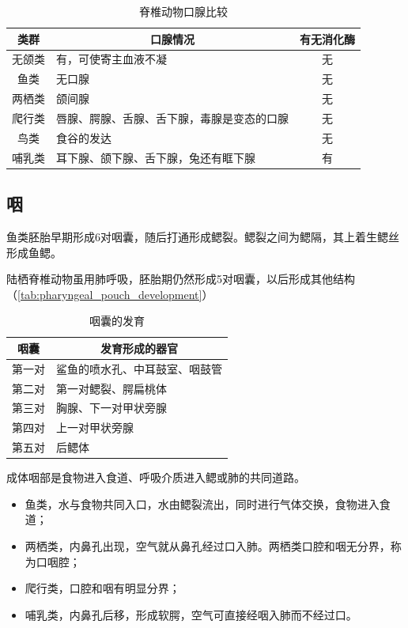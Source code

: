 \begin{table}[htbp]
	\centering
	\begin{tabularx}{\textwidth}{|c|X|c|}
		\hline
		\textbf{类群} & \multicolumn{1}{c|}{\textbf{口腺情况}} & \textbf{有无消化酶} \\ \hline
		无颌类 & 有，可使寄主血液不凝 & 无 \\ \hline
		鱼类 & 无口腺 & 无 \\ \hline
		两栖类 & 颌间腺 & 无 \\ \hline
		爬行类 & 唇腺、腭腺、舌腺、舌下腺，毒腺是变态的口腺 & 无 \\ \hline
		鸟类 & 食谷的发达 & 无\footnotemark \\ \hline
		哺乳类 & 耳下腺、颌下腺、舌下腺，兔还有眶下腺 & 有 \\ \hline
	\end{tabularx}
	\caption{脊椎动物口腺比较}
	\label{tab:oral_gland}
\end{table}

\subsection{咽}

鱼类胚胎早期形成6对咽囊，随后打通形成鳃裂。鳃裂之间为鳃隔，其上着生鳃丝形成鱼鳃。

陆栖脊椎动物虽用肺呼吸，胚胎期仍然形成5对咽囊，以后形成其他结构（\autoref{tab:pharyngeal_pouch_development}）

\begin{table}[htbp]
	\centering
	\begin{tabularx}{\textwidth}{|c|X|}
		\hline
		咽囊 & \multicolumn{1}{c|}{发育形成的器官} \\ \hline
		第一对 & 鲨鱼的喷水孔、中耳鼓室、咽鼓管 \\ \hline
		第二对 & 第一对鳃裂、腭扁桃体 \\ \hline
		第三对 & 胸腺、下一对甲状旁腺 \\ \hline
		第四对 & 上一对甲状旁腺 \\ \hline
		第五对 & 后鳃体 \\ \hline
	\end{tabularx}
	\caption{咽囊的发育}
	\label{tab:pharyngeal_pouch_development}
\end{table}

成体咽部是食物进入食道、呼吸介质进入鳃或肺的共同道路。

\begin{itemize}
	\item 鱼类，水与食物共同入口，水由鳃裂流出，同时进行气体交换，食物进入食道；
	\item 两栖类，内鼻孔出现，空气就从鼻孔经过口入肺。两栖类口腔和咽无分界，称为口咽腔；
	\item 爬行类，口腔和咽有明显分界；
	\item 哺乳类，内鼻孔后移，形成软腭，空气可直接经咽入肺而不经过口。
\end{itemize}


